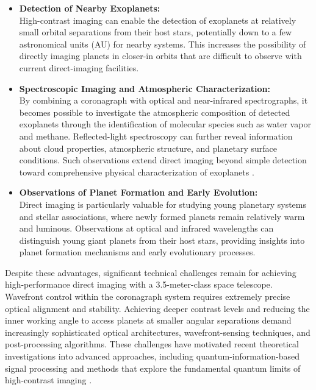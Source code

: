 \begin{itemize}
\item
  \textbf{Detection of Nearby Exoplanets:}\\
  High-contrast imaging can enable the detection of exoplanets at relatively small orbital separations from their host stars, potentially down to a few astronomical units (AU) for nearby systems. This increases the possibility of directly imaging planets in closer-in orbits that are difficult to observe with current direct-imaging facilities.
\item
  \textbf{Spectroscopic Imaging and Atmospheric Characterization:}\\
  By combining a coronagraph with optical and near-infrared spectrographs, it becomes possible to investigate the atmospheric composition of detected exoplanets through the identification of molecular species such as water vapor and methane. Reflected-light spectroscopy can further reveal information about cloud properties, atmospheric structure, and planetary surface conditions. Such observations extend direct imaging beyond simple detection toward comprehensive physical characterization of exoplanets \cite{houlle2021}.
\item
  \textbf{Observations of Planet Formation and Early Evolution:}\\
  Direct imaging is particularly valuable for studying young planetary systems and stellar associations, where newly formed planets remain relatively warm and luminous. Observations at optical and infrared wavelengths can distinguish young giant planets from their host stars, providing insights into planet formation mechanisms and early evolutionary processes.
\end{itemize}


Despite these advantages, significant technical challenges remain for achieving high-performance direct imaging with a 3.5-meter-class space telescope. Wavefront control within the coronagraph system requires extremely precise optical alignment and stability. Achieving deeper contrast levels and reducing the inner working angle to access planets at smaller angular separations demand increasingly sophisticated optical architectures, wavefront-sensing techniques, and post-processing algorithms. These challenges have motivated recent theoretical investigations into advanced approaches, including quantum-information-based signal processing and methods that explore the fundamental quantum limits of high-contrast imaging \cite{deshler2024}.

